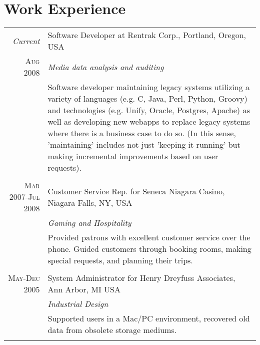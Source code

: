\documentclass[a4paper,10pt]{article}
\begin{document}
\section{Work Experience}
\begin{tabular}{r|p{11cm}}
\emph{Current}      & Software Developer at Rentrak Corp., Portland, Oregon, USA\\
\textsc{Aug 2008}   & \emph{Media data analysis and auditing}\\
                    & \fontsize{9pt}{10pt}\selectfont
                                    Software developer maintaining legacy systems utilizing a variety of languages
                                    (e.g. C, Java, Perl, Python, Groovy) and technologies (e.g. Unify, Oracle,
                                    Postgres, Apache) as well as developing new webapps to replace legacy systems
                                    where there is a business case to do so. (In this sense, 'maintaining' includes
                                    not just 'keeping it running' but making incremental improvements based on user
                                    requests).\\
\multicolumn{2}{c}{}\\ %
\textsc{Mar 2007-Jul 2008}   & Customer Service Rep. for Seneca Niagara Casino, Niagara Falls, NY, USA\\
                                &\emph{Gaming and Hospitality}\\
                                & \fontsize{9pt}{10pt}\selectfont
                                                Provided patrons with excellent customer service over the phone. Guided
                                                customers through booking rooms, making special requests, and planning their
                                                trips.\\
\multicolumn{2}{c}{}\\ %
\textsc{May-Dec 2005}   & System Administrator for Henry Dreyfuss Associates, Ann Arbor, MI USA\\
                        &\emph{Industrial Design}\\
                        & \fontsize{9pt}{10pt}\selectfont
                                                Supported users in a Mac/PC environment, recovered old data from obsolete
                                                storage mediums.\\
\multicolumn{2}{c}{}\\ %
\end{tabular}

\end{document}
